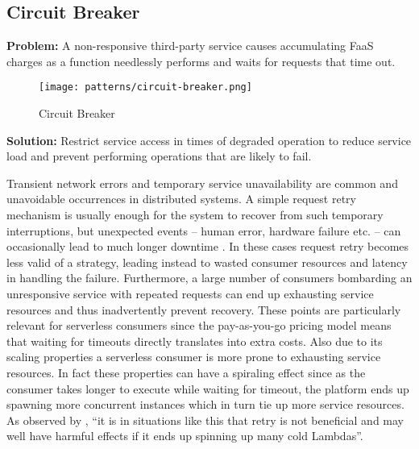 \subsection{Circuit Breaker} \label{subsec:circuitBreaker}

\textbf{Problem:} A non-responsive third-party service causes accumulating FaaS charges as a function needlessly performs and waits for requests that time out.

\begin{figure}[h]
  \centering
  \texttt{[image: patterns/circuit-breaker.png]}
  \caption{Circuit Breaker}
  \label{fig:circuitBreaker}
\end{figure}

\textbf{Solution:} Restrict service access in times of degraded operation to reduce service load and prevent performing operations that are likely to fail.

Transient network errors and temporary service unavailability are common and unavoidable occurrences in distributed systems. A simple request retry mechanism is usually enough for the system to recover from such temporary interruptions, but unexpected events -- human error, hardware failure etc. -- can occasionally lead to much longer downtime \parencite{microsoft18cloudPatterns}. In these cases request retry becomes less valid of a strategy, leading instead to wasted consumer resources and latency in handling the failure. Furthermore, a large number of consumers bombarding an unresponsive service with repeated requests can end up exhausting service resources and thus inadvertently prevent recovery. These points are particularly relevant for serverless consumers since the pay-as-you-go pricing model means that waiting for timeouts directly translates into extra costs. Also due to its scaling properties a serverless consumer is more prone to exhausting service resources. In fact these properties can have a spiraling effect since as the consumer takes longer to execute while waiting for timeout, the platform ends up spawning more concurrent instances which in turn tie up more service resources. As observed by \textcite{bardsley18optimizationStrategies}, ``it is in situations like this that retry is not beneficial and may well have harmful effects if it ends up spinning up many cold Lambdas''.

